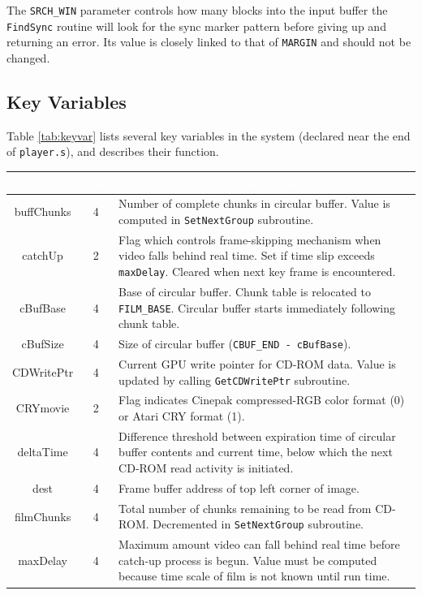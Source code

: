 \documentclass[12pt,letterpaper,twoside]{article}
\newcommand{\tabheadtxt}[1]{\multicolumn{1}{c}{\textcolor{white}{\textbf{#1}}}}
\begin{document}
The \texttt{SRCH\_WIN} parameter controls how many blocks into the input buffer the \texttt{FindSync} routine will look for the sync marker pattern before giving up and returning an error. Its value is closely linked to that of \texttt{MARGIN} and should not be changed.

\subsection{Key Variables}
Table \ref{tab:keyvar} lists several key variables in the system (declared near the end of \texttt{player.s}), and describes their function.

\begin{table}[h]
\centering
\begin{tabular}{|c|c|p{10cm}|}
\hline
\rowcolor{black}
\tabheadtxt{Variable} & \tabheadtxt{Size} & \tabheadtxt{Description} \\
\hline
buffChunks & 4 & Number of complete chunks in circular buffer. Value is computed in \texttt{SetNextGroup} subroutine. \\
\hline
catchUp & 2 & Flag which controls frame-skipping mechanism when video falls behind real time. Set if time slip exceeds \texttt{maxDelay}. Cleared when next key frame is encountered. \\
\hline
cBufBase & 4 & Base of circular buffer. Chunk table is relocated to \texttt{FILM\_BASE}. Circular buffer starts immediately following chunk table. \\
\hline
cBufSize & 4 & Size of circular buffer (\texttt{CBUF\_END - cBufBase}). \\
\hline
CDWritePtr & 4 & Current GPU write pointer for CD-ROM data. Value is updated by calling \texttt{GetCDWritePtr} subroutine. \\
\hline
CRYmovie & 2 & Flag indicates Cinepak compressed-RGB color format (0) or Atari CRY format (1). \\
\hline
deltaTime & 4 & Difference threshold between expiration time of circular buffer contents and current time, below which the next CD-ROM read activity is initiated. \\
\hline
dest & 4 & Frame buffer address of top left corner of image. \\
\hline
filmChunks & 4 & Total number of chunks remaining to be read from CD-ROM. Decremented in \texttt{SetNextGroup} subroutine. \\
\hline
maxDelay & 4 & Maximum amount video can fall behind real time before catch-up process is begun. Value must be computed because time scale of film is not known until run time. \\

\end{tabular}
\end{table}
\end{document}
